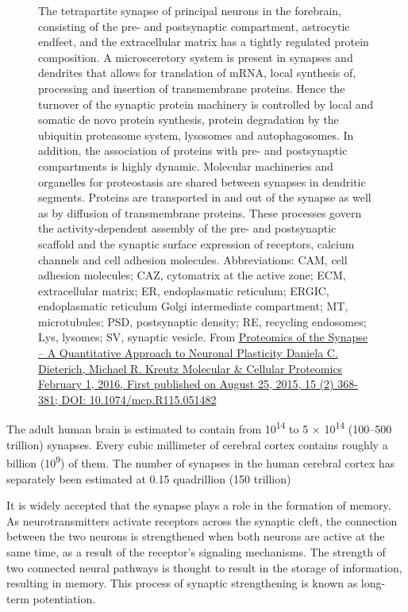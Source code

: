 \begin{figure}
\caption{The tetrapartite synapse of principal neurons in the forebrain, consisting of the pre- and postsynaptic compartment, astrocytic endfeet, and the extracellular matrix has a tightly regulated protein composition. A microsceretory system is present in synapses and dendrites that allows for translation of mRNA, local synthesis of, processing and insertion of transmembrane proteins. Hence the turnover of the synaptic protein machinery is controlled by local and somatic de novo protein synthesis, protein degradation by the ubiquitin proteasome system, lysosomes and autophagosomes. In addition, the association of proteins with pre- and postsynaptic compartments is highly dynamic. Molecular machineries and organelles for proteostasis are shared between synapses in dendritic segments. Proteins are transported in and out of the synapse as well as by diffusion of transmembrane proteins. These processes govern the activity-dependent assembly of the pre- and postsynaptic scaffold and the synaptic surface expression of receptors, calcium channels and cell adhesion molecules. Abbreviations: CAM, cell adhesion molecules; CAZ, cytomatrix at the active zone; ECM, extracellular matrix; ER, endoplasmatic reticulum; ERGIC, endoplasmatic reticulum Golgi intermediate compartment; MT, microtubules; PSD, postsynaptic density; RE, recycling endosomes; Lys, lysomes; SV, synaptic vesicle. From \href{https://doi.org/10.1074/mcp.R115.051482}{Proteomics of the Synapse -- A Quantitative Approach to Neuronal Plasticity Daniela C. Dieterich, Michael R. Kreutz Molecular \& Cellular Proteomics February 1, 2016, First published on August 25, 2015, 15 (2) 368-381; DOI: 10.1074/mcp.R115.051482}}\label{fig:synapsediagram}
\end{figure}

The adult human brain is estimated to contain from 10\textsuperscript{14} to 5 × 10\textsuperscript{14} (100--500 trillion) synapses. Every cubic millimeter of cerebral cortex contains roughly a billion (10\textsuperscript{9}) of them. The number of synapses in the human cerebral cortex has separately been estimated at 0.15 quadrillion (150 trillion)

It is widely accepted that the synapse plays a role in the formation of memory. As neurotransmitters activate receptors across the synaptic cleft, the connection between the two neurons is strengthened when both neurons are active at the same time, as a result of the receptor's signaling mechanisms. The strength of two connected neural pathways is thought to result in the storage of information, resulting in memory. This process of synaptic strengthening is known as long-term potentiation.

